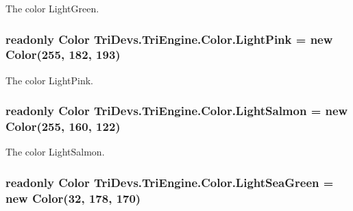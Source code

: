 The color Light\-Green. 

\hypertarget{struct_tri_devs_1_1_tri_engine_1_1_color_ad1dfc40698e9fc290f9045dfe0ccd26f}{
\subsubsection[{Light\-Pink}]{\setlength{\rightskip}{0pt plus 5cm}readonly {\bf Color} Tri\-Devs.\-Tri\-Engine.\-Color.\-Light\-Pink = new {\bf Color}(255, 182, 193)\hspace{0.3cm}{\ttfamily [static]}}}\label{struct_tri_devs_1_1_tri_engine_1_1_color_ad1dfc40698e9fc290f9045dfe0ccd26f}


The color Light\-Pink. 

\hypertarget{struct_tri_devs_1_1_tri_engine_1_1_color_a0954f4529bbdbebc3890dc1fcb85211c}{
\subsubsection[{Light\-Salmon}]{\setlength{\rightskip}{0pt plus 5cm}readonly {\bf Color} Tri\-Devs.\-Tri\-Engine.\-Color.\-Light\-Salmon = new {\bf Color}(255, 160, 122)\hspace{0.3cm}{\ttfamily [static]}}}\label{struct_tri_devs_1_1_tri_engine_1_1_color_a0954f4529bbdbebc3890dc1fcb85211c}


The color Light\-Salmon. 

\hypertarget{struct_tri_devs_1_1_tri_engine_1_1_color_abf128d7ddcd03c1f6a04563b6efb4502}{
\subsubsection[{Light\-Sea\-Green}]{\setlength{\rightskip}{0pt plus 5cm}readonly {\bf Color} Tri\-Devs.\-Tri\-Engine.\-Color.\-Light\-Sea\-Green = new {\bf Color}(32, 178, 170)\hspace{0.3cm}{\ttfamily [static]}}}\label{struct_tri_devs_1_1_tri_engine_1_1_color_abf128d7ddcd03c1f6a04563b6efb4502}


